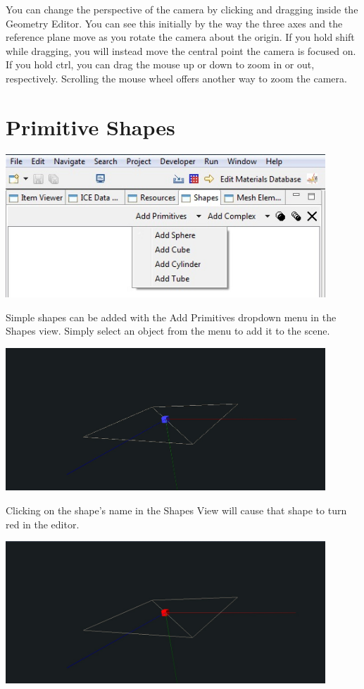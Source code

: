 You can change the perspective of the camera by clicking and dragging inside the
Geometry Editor. You can see this initially by the way the three axes and the
reference plane move as you rotate the camera about the origin. If you hold shift while dragging, you will instead move the central point the camera is focused on. If you hold ctrl, you can drag the mouse up or down to zoom in or out, respectively. Scrolling the mouse wheel offers another way to zoom the camera.

\section{Primitive Shapes}

\begin{center}
\includegraphics[width=12cm]{images/GeometryAddPrimitive.jpg}
\end{center}

Simple shapes can be added with the Add Primitives dropdown menu in the Shapes
view. Simply select an object from the menu to add it to the scene.

\begin{center}
\includegraphics[width=12cm]{images/GeometryAddCube.jpg}
\end{center}

Clicking on the shape's name in the Shapes View will cause that shape to turn
red in the editor.

\begin{center}
\includegraphics[width=12cm]{images/GeometrySelectCube.jpg}
\end{center}

